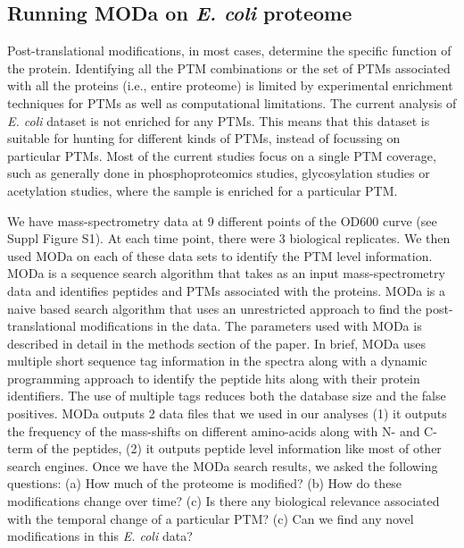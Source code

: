 \documentclass[12pt]{article}
\begin{document}
\subsection{Running MODa on \emph{E. coli} proteome}
Post-translational modifications, in most cases, determine the specific function of the protein. Identifying all the PTM combinations or the set of PTMs associated with all the proteins (i.e., entire proteome) is limited by experimental enrichment techniques for PTMs as well as computational limitations. The current analysis of \emph{E. coli} dataset is not enriched for any PTMs. This means that this dataset is suitable for hunting for different kinds of PTMs, instead of focussing on particular PTMs. Most of the current studies focus on a single PTM coverage, such as generally done in phosphoproteomics studies, glycosylation studies or acetylation studies, where the sample is enriched for a particular PTM. 

We have mass-spectrometry data at 9 different points of the OD600 curve (see Suppl Figure S1). At each time point, there were 3 biological replicates. We then used MODa on each of these data sets to identify the PTM level information. MODa is a sequence search algorithm that takes as an input mass-spectrometry data and identifies peptides and PTMs associated with the proteins. MODa is a naive based search algorithm that uses an unrestricted approach to find the post-translational modifications in the data. The parameters used with MODa is described in detail in the methods section of the paper. In brief, MODa uses multiple short sequence tag information in the spectra along with a dynamic programming approach to identify the peptide hits along with their protein identifiers. The use of multiple tags reduces both the database size and the false positives. MODa outputs 2 data files that we used in our analyses (1) it outputs the frequency of the mass-shifts on different amino-acids along with N- and C- term of the peptides, (2) it outputs peptide level information like most of other search engines. Once we have the MODa search results, we asked the following questions: (a) How much of the proteome is modified? (b) How do these modifications change over time? (c) Is there any biological relevance associated with the temporal change of a particular PTM? (c) Can we find any novel modifications in this \emph{E. coli} data? 

\end{document}
